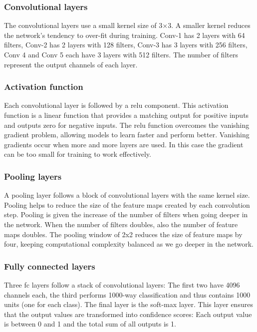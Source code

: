 \subsubsection{Convolutional layers}
The convolutional layers use a small kernel size of 3×3. A smaller kernel reduces the network’s tendency to over-fit during training. Conv-1 has 2 layers with 64 filters, Conv-2 has 2 layers with 128 filters, Conv-3 has 3 layers with 256 filters, Conv 4 and Conv 5 each have 3 layers with 512 filters. The number of filters represent the output channels of each layer.

\subsubsection{Activation function}
Each convolutional layer is followed by a \acrfull{relu} component. This activation function is a linear function that provides a matching output for positive inputs and outputs zero for negative inputs. The \acrshort{relu} function overcomes the vanishing gradient problem, allowing models to learn faster and perform better. Vanishing gradients occur when more and more layers are used. In this case the gradient can be too small for training to work effectively.

\subsubsection{Pooling layers}
A pooling layer follows a block of convolutional layers with the same kernel size. Pooling helps to reduce the size of the feature maps created by each convolution step. Pooling is given the increase  of the number of filters when going deeper in the network. When the number of filters doubles, also the number of feature maps doubles. The pooling window of 2x2 reduces the size of feature maps by four, keeping computational complexity balanced as we go deeper in the network.

\subsubsection{Fully connected layers}
Three \acrshort{fc} layers follow a stack of convolutional layers: The first two have 4096 channels each, the third performs 1000-way  classification and thus contains 1000 units (one for each class). The final layer is the soft-max layer. This layer ensures that the output values are transformed into confidence scores: Each output value is between 0 and 1 and the total sum of all outputs is 1.

